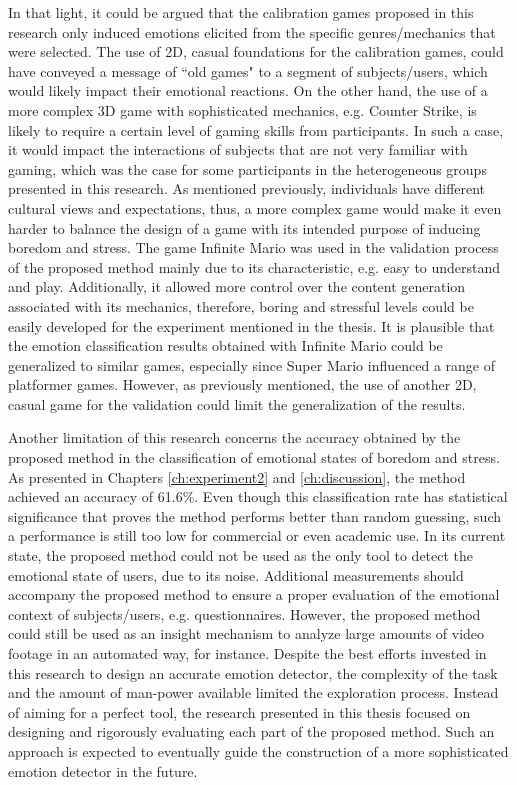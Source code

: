 In that light, it could be argued that the calibration games proposed in this research only induced emotions elicited from the specific genres/mechanics that were selected. The use of 2D, casual foundations for the calibration games, could have conveyed a message of ``old games" to a segment of subjects/users, which would likely impact their emotional reactions. On the other hand, the use of a more complex 3D game with sophisticated mechanics, e.g. Counter Strike, is likely to require a certain level of gaming skills from participants. In such a case, it would impact the interactions of subjects that are not very familiar with gaming, which was the case for some participants in the heterogeneous groups presented in this research. As mentioned previously, individuals have different cultural views and expectations, thus, a more complex game would make it even harder to balance the design of a game with its intended purpose of inducing boredom and stress. The game Infinite Mario was used in the validation process of the proposed method mainly due to its characteristic, e.g. easy to understand and play. Additionally, it allowed more control over the content generation associated with its mechanics, therefore, boring and stressful levels could be easily developed for the experiment mentioned in the thesis. It is plausible that the emotion classification results obtained with Infinite Mario could be generalized to similar games, especially since Super Mario influenced a range of platformer games. However, as previously mentioned, the use of another 2D, casual game for the validation could limit the generalization of the results.

Another limitation of this research concerns the accuracy obtained by the proposed method in the classification of emotional states of boredom and stress. As presented in Chapters \ref{ch:experiment2} and \ref{ch:discussion}, the method achieved an accuracy of 61.6\%. Even though this classification rate has statistical significance that proves the method performs better than random guessing, such a performance is still too low for commercial or even academic use. In its current state, the proposed method could not be used as the only tool to detect the emotional state of users, due to its noise. Additional measurements should accompany the proposed method to ensure a proper evaluation of the emotional context of subjects/users, e.g. questionnaires. However, the proposed method could still be used as an insight mechanism to analyze large amounts of video footage in an automated way, for instance. Despite the best efforts invested in this research to design an accurate emotion detector, the complexity of the task and the amount of man-power available limited the exploration process. Instead of aiming for a perfect tool, the research presented in this thesis focused on designing and rigorously evaluating each part of the proposed method. Such an approach is expected to eventually guide the construction of a more sophisticated emotion detector in the future.

